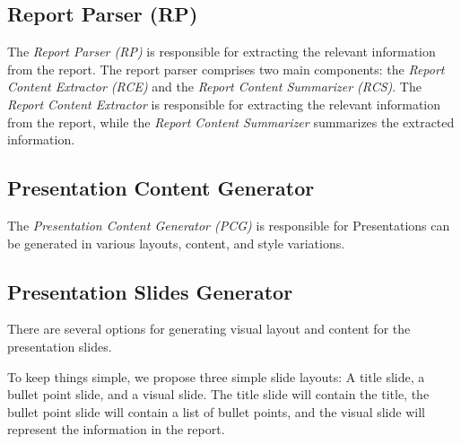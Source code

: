 \subsection{Report Parser (RP)}
The \emph{Report Parser (RP)} is responsible for extracting the relevant information from the report. The report parser comprises two main components: the \emph{Report Content Extractor (RCE)} and the \emph{Report Content Summarizer (RCS)}. The \emph{Report Content Extractor} is responsible for extracting the relevant information from the report, while the \emph{Report Content Summarizer} summarizes the extracted information.

\subsection{Presentation Content Generator}
The \emph{Presentation Content Generator (PCG)} is responsible for 
Presentations can be generated in various layouts, content, and style variations. 

\subsection{Presentation Slides Generator}
There are several options for generating visual layout and content for the presentation slides. 

To keep things simple, we propose three simple slide layouts: A title slide, a bullet point slide, and a visual slide. The title slide will contain the title, the bullet point slide will contain a list of bullet points, and the visual slide will represent the information in the report.

